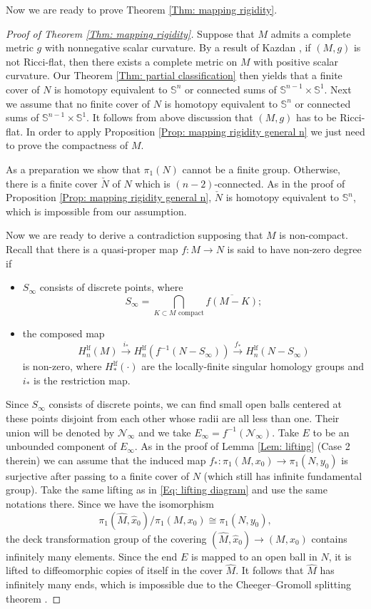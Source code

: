 \documentclass[11pt,letterpaper]{amsart}
\numberwithin{equation}{section}
\theoremstyle{definition}
\begin{document}
Now we are ready to prove Theorem \ref{Thm: mapping rigidity}.
\begin{proof}[Proof of Theorem \ref{Thm: mapping rigidity}]
Suppose that $M$ admits a complete metric $g$ with nonnegative scalar curvature. By a result of Kazdan \cite{Kaz82}, if $(M,g)$ is not Ricci-flat, then there exists a complete metric on $M$ with positive scalar curvature. Our Theorem \ref{Thm: partial classification} then yields that a finite cover of $N$ is homotopy equivalent to $\mathbb{S}^n$ or connected sums of $\mathbb{S}^{n-1} \times \mathbb{S}^1$. Next we assume that no finite cover of $N$ is homotopy equivalent to $\mathbb{S}^n$ or connected sums of $\mathbb{S}^{n-1} \times \mathbb{S}^1$.  It follows from above discussion that $(M,g)$ has to be Ricci-flat. In order to apply Proposition \ref{Prop: mapping rigidity general n} we just need to prove the compactness of $M$.

As a preparation we show that $\pi_1(N)$ cannot be a finite group. Otherwise, there is a finite cover $\check N$ of $N$ which is $(n-2)$-connected. As in the proof of Proposition \ref{Prop: mapping rigidity general n}, $\check N$ is homotopy equivalent to $\mathbb S^n$, which is impossible from our assumption.

Now we are ready to derive a contradiction supposing that $M$ is non-compact.
Recall that there is a quasi-proper map $f:M\to N$ is said to have non-zero degree if
\begin{itemize}\setlength{\itemsep}{1mm}
	\item $S_\infty$ consists of discrete points, where
 $$S_\infty=\bigcap_{K\subset M \text{ compact}} \overline{f(M-K)};$$
	\item the composed map
	$$H_n^{\mathrm{lf}}(M)\xrightarrow{i_*} H_n^{\mathrm{lf}}(f^{-1}(N-S_\infty))\xrightarrow{f_*} H_n^{\mathrm{lf}}(N-S_\infty)$$
	is non-zero, where $H_{\ast}^{\mathrm{lf}}(\cdot)$ are the locally-finite singular homology groups and $i_{*}$ is the restriction map.
\end{itemize}
Since $S_\infty$ consists of discrete points, we can find small open balls centered at these points disjoint from each other whose radii are all less than one. Their union will be denoted by $\mathcal N_\infty$ and we take $E_\infty=f^{-1}(\mathcal N_\infty)$.
Take $E$ to be an unbounded component of $E_\infty$. As in the proof of Lemma \ref{Lem: lifting} (Case 2 therein) we can assume that the induced map $f_*:\pi_1(M,x_0)\to \pi_1(N,y_0)$ is surjective after passing to a finite cover of $N$ (which still has infinite fundamental group). Take the same lifting as in \eqref{Eq: lifting diagram} and use the same notations there. Since we have the isomorphism
$$
\pi_1(\widehat M,\hat x_0)/\pi_1(M,x_0)\cong \pi_1(N,y_0),
$$
the deck transformation group of the covering $(\widehat M,\hat x_0)\to (M,x_0)$ contains infinitely many elements.
Since the end $E$ is mapped to an open ball in $N$, {it is lifted to diffeomorphic copies of itself in the cover $\widehat M$. It follows that $\widehat M$ has infinitely many ends,} which is impossible due to the Cheeger--Gromoll splitting theorem \cite{CG71}.
\end{proof}
\end{document}
